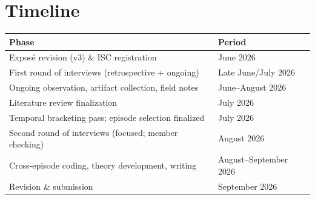 \documentclass[11pt,a4paper]{article}
\begin{document}
\section*{Timeline}
\begin{center}
\begin{tabular}{@{}ll@{}}
\toprule
\textbf{Phase} & \textbf{Period} \\
\midrule
Exposé revision (v3) \& ISC registration & June 2026 \\
First round of interviews (retrospective + ongoing) & Late June/July 2026 \\
Ongoing observation, artifact collection, field notes & June--August 2026 \\
Literature review finalization & July 2026 \\
Temporal bracketing pass; episode selection finalized & July 2026 \\
Second round of interviews (focused; member checking) & August 2026 \\
Cross-episode coding, theory development, writing & August--September 2026 \\
Revision \& submission & September 2026 \\
\bottomrule
\end{tabular}
\end{center}

\printbibliography[title={References}]
\end{document}
